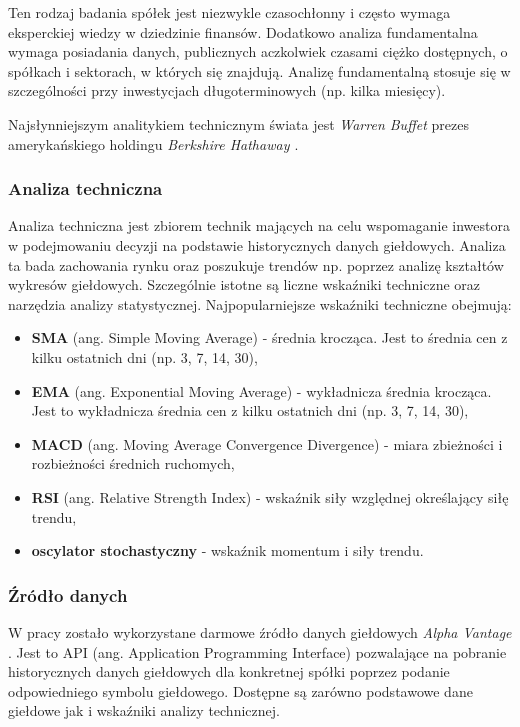 \documentclass[a4paper, twoside, 11pt, openright]{article}
\begin{document}
Ten rodzaj badania spółek jest niezwykle czasochłonny i często wymaga eksperckiej wiedzy w dziedzinie finansów. Dodatkowo analiza fundamentalna wymaga posiadania danych, publicznych aczkolwiek czasami ciężko dostępnych, o spółkach i sektorach, w których się znajdują. Analizę fundamentalną stosuje się w szczególności przy inwestycjach długoterminowych (np. kilka miesięcy).

Najsłynniejszym analitykiem technicznym świata jest \textit{Warren Buffet} prezes amerykańskiego holdingu \textit{Berkshire Hathaway \cite{berkeshire}}. 

\subsubsection{Analiza techniczna}

Analiza techniczna \cite{technicalanalysis} jest zbiorem technik mających na celu wspomaganie inwestora w podejmowaniu decyzji na podstawie historycznych danych giełdowych. Analiza ta bada zachowania rynku oraz poszukuje trendów np. poprzez analizę kształtów wykresów giełdowych. Szczególnie istotne są liczne wskaźniki techniczne oraz narzędzia analizy statystycznej.
Najpopularniejsze wskaźniki techniczne obejmują:
\begin{itemize}
\item{\textbf{SMA} (ang. Simple Moving Average)} - średnia krocząca. Jest to średnia cen z kilku ostatnich dni (np. 3, 7, 14, 30),
\item{\textbf{EMA} (ang. Exponential Moving Average)} - wykładnicza średnia krocząca. Jest to wykładnicza średnia cen z kilku ostatnich dni (np. 3, 7, 14, 30),
\item{\textbf{MACD} (ang. Moving Average Convergence Divergence)} -  miara zbieżności i rozbieżności średnich ruchomych,
\item{\textbf{RSI} (ang. Relative Strength Index)} -  wskaźnik siły względnej określający siłę trendu,
\item{\textbf{oscylator stochastyczny}} -  wskaźnik momentum i siły trendu.
\end{itemize}

\subsubsection{Źródło danych}

W pracy zostało wykorzystane darmowe źródło danych giełdowych \textit{Alpha Vantage} \cite{alphavantage}. Jest to API (ang. Application Programming Interface) pozwalające na pobranie historycznych danych giełdowych dla konkretnej spółki poprzez podanie odpowiedniego symbolu giełdowego. Dostępne są zarówno podstawowe dane giełdowe jak i wskaźniki analizy technicznej. 
\end{document}

